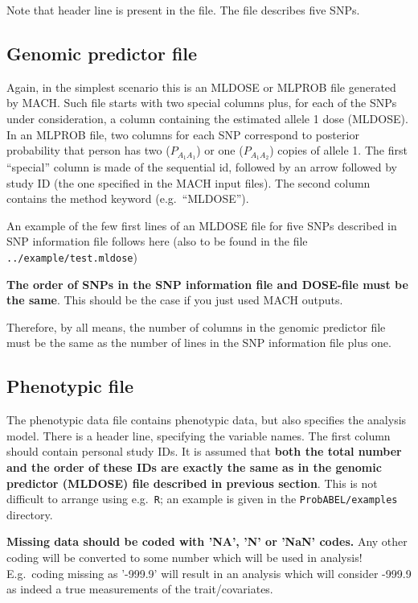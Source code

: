 \documentclass[12pt,a4paper]{article}
\begin{document}
Note that header line is present in the file. The file describes
five SNPs.

\subsection{Genomic predictor file}
\label{ssec:dosein}

Again, in the simplest scenario this is an MLDOSE or MLPROB file generated by MACH.
Such file starts with two special columns plus, for each of the SNPs
under consideration, a column containing the estimated allele 1 dose (MLDOSE).
In an MLPROB file, two columns for each SNP correspond to posterior probability
that person has two ($P_{A_1A_1}$) or one ($P_{A_1A_2}$) copies of allele 1.
The first ``special'' column is made of the sequential id,
followed by an arrow followed by study ID (the one specified in the
MACH input files). The second column contains the method  keyword
(e.g.~``MLDOSE'').

An example of the few first lines of an MLDOSE file for
five SNPs described in SNP information file follows here (also
to be found in the file \texttt{../example/test.mldose})



\textbf{The order of SNPs in the SNP information file and DOSE-file
must be the same}. This should be the case if you just used MACH outputs.

Therefore, by all means, the number of columns in the genomic predictor file
must be the same as the number of lines in the SNP information file plus one.

\subsection{Phenotypic file}
\label{ssec:phenoin}

The phenotypic data file contains phenotypic data, but also specifies the
analysis model. There is a header line, specifying the variable names.
The first column should contain personal study IDs. It is assumed
that \textbf{both the total number and the order of these IDs are
exactly the same as in the genomic predictor (MLDOSE) file described in
previous section}. This is not difficult to arrange using e.g.~\texttt{R};
an example is given in the \texttt{ProbABEL/examples} directory.

\textbf{Missing data should be coded with 'NA', 'N' or 'NaN' codes.} Any
other coding will be converted to some number which will be used in
analysis! E.g.~coding missing as '-999.9' will result in an analysis which
will consider -999.9 as indeed a true measurements of the trait/covariates.
\end{document}
